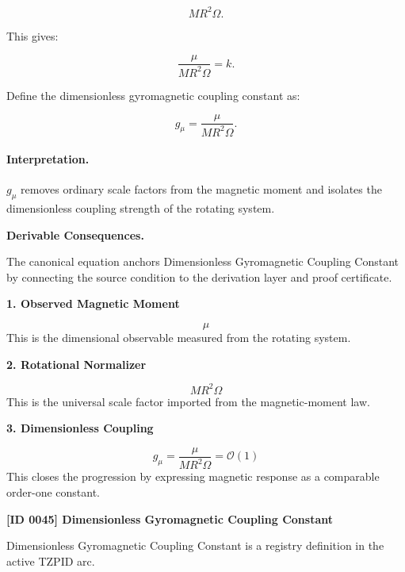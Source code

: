 \begin{equation}
MR^2\Omega .
\end{equation}

This gives:

\begin{equation}
\frac{\mu}{MR^2\Omega}=k .
\end{equation}

Define the dimensionless gyromagnetic coupling constant as:

\begin{equation}
\boxed{
g_{\mu}
=
\frac{\mu}
{MR^2\Omega}.
}
\end{equation}

\paragraph{Interpretation.}
$g_{\mu}$ removes ordinary scale factors from the magnetic moment and isolates the dimensionless coupling strength of the rotating system.

\par\vspace{0.35em}
\noindent\textbf{Derivable Consequences.}\quad
\begingroup
\footnotesize
\raggedright
The canonical equation anchors Dimensionless Gyromagnetic Coupling Constant by connecting the source condition to the derivation layer and proof certificate.
\par\endgroup

\noindent\textbf{1. Observed Magnetic Moment}\par
\[
\mu
\]
\noindent This is the dimensional observable measured from the rotating system.\par
\noindent\textbf{2. Rotational Normalizer}\par
\[
M R^{2}\Omega
\]
\noindent This is the universal scale factor imported from the magnetic-moment law.\par
\noindent\textbf{3. Dimensionless Coupling}\par
\[
g_{\mu}
=
\frac{\mu}{M R^{2}\Omega}
=
\mathcal{O}(1)
\]
\noindent This closes the progression by expressing magnetic response as a comparable order-one constant.\par

\clearpage
\noindent\textbf{[ID 0045] Dimensionless Gyromagnetic Coupling Constant}\par
\vspace{0.35em}
\begingroup\small
{}
Dimensionless Gyromagnetic Coupling Constant is a registry definition in the active TZPID arc.

